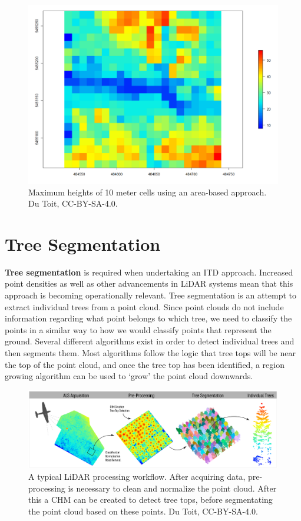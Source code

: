 \documentclass[
]{book}
\begin{document}
\begin{figure}
\includegraphics[width=0.7\linewidth]{images/15-las-hmax-2D} \caption{Maximum heights of 10 meter cells using an area-based approach. Du Toit, CC-BY-SA-4.0.}\label{fig:15-las-hmax-2D}
\end{figure}

\section{Tree Segmentation}\label{tree-segmentation}

\textbf{Tree segmentation} is required when undertaking an ITD approach. Increased point densities as well as other advancements in LiDAR systems mean that this approach is becoming operationally relevant. Tree segmentation is an attempt to extract individual trees from a point cloud. Since point clouds do not include information regarding what point belongs to which tree, we need to classify the points in a similar way to how we would classify points that represent the ground. Several different algorithms exist in order to detect individual trees and then segments them. Most algorithms follow the logic that tree tops will be near the top of the point cloud, and once the tree top has been identified, a region growing algorithm can be used to `grow' the point cloud downwards.

\begin{figure}
\includegraphics[width=0.9\linewidth]{images/15-Processing-Flowchart} \caption{A typical LiDAR processing workflow. After acquiring data, pre-processing is necessary to clean and normalize the point cloud. After this a CHM can be created to detect tree tops, before segmentating the point cloud based on these points. Du Toit, CC-BY-SA-4.0.}\label{fig:15-Processing-Flowchart}
\end{figure}
\end{document}
